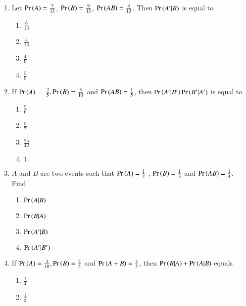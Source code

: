 \begin{enumerate}[label=\thesubsection.\arabic*,ref=\thesubsection.\theenumi]
\item Let $\Pr\left(A\right) = \frac{7}{13}$, $\Pr\left(B\right) = \frac{9}{13}$, $\Pr\left(AB\right) = \frac{4}{13}$. Then $\Pr\left(A^{\prime}|B\right)$ is equal to
\begin{multicols}{4}
\begin{enumerate}
\item $\frac{6}{13}$
\item $\frac{4}{13}$
\item $\frac{4}{9}$
\item $\frac{5}{9}$
\end{enumerate}
\end{multicols}
\solution

\item If $\Pr\left(A\right)$ = $\frac{2}{5}, \Pr\left(B\right) = \frac{3}{10}$ and $\Pr\left(AB\right) = \frac{1}{5}$, then $\Pr\left(A^{\prime}|B^{\prime}\right)\Pr\left(B^{\prime}|A^{\prime}\right)$ is equal to 
\begin{multicols}{4}
\begin{enumerate}
\item 
$\frac{5}{6}$
\item 
$\frac{5}{7}$
\item 
$\frac{25}{42}$
\item 
$1$
\end{enumerate}
\end{multicols}
\solution

\item $A$ and $B$ are two events such that $\Pr\left(A\right)= \frac{1}{2}$ , $\Pr\left(B\right)= \frac{1}{3}$ and $\Pr\left(AB\right)= \frac{1}{4}$. Find
\begin{multicols}{4}
\begin{enumerate}
\item $\Pr\left(A|B\right)$  \item $\Pr\left(B|A\right)$  \item $\Pr\left(A^{\prime}|B\right)$  \item $\Pr\left(A^{\prime}|B^{\prime}\right)$
\end{enumerate}
\end{multicols}
\solution

\item If $\Pr\left(A\right) = \frac{3}{10}, \Pr\left(B\right) = \frac{2}{5}$ and $\Pr\left(A+B\right) = \frac{3}{5}$, then $\Pr\left( B | A\right) + \Pr\left( A | B\right) $ equals
\begin{multicols}{4}
\begin{enumerate}
	\item $\frac{1}{4}$ 
	\item $\frac{1}{3}$ 

\end{enumerate}
\end{multicols}
\end{enumerate}
